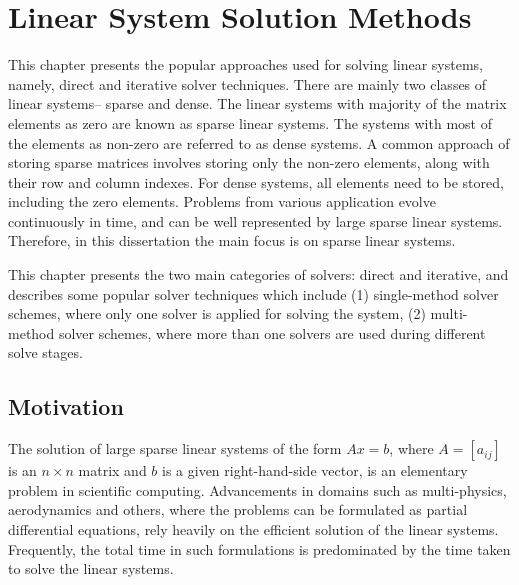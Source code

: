 \chapter{Linear System Solution Methods} \label{LS} 

This chapter presents the popular approaches used for solving linear systems, namely, 
direct and iterative solver techniques.  There are mainly two classes of linear systems-- sparse and dense. The linear systems with majority of the matrix elements as zero are known as sparse linear systems. The systems with most of the elements as non-zero are referred to as dense systems. A common approach of storing sparse matrices involves storing only the non-zero elements, along with their row and column indexes. For dense systems, all elements need to be
stored, including the zero elements. Problems from various application evolve continuously in time, and can be well represented by large sparse linear systems. Therefore, in this dissertation the main focus is on sparse linear systems.

This chapter presents the two main categories of solvers: direct and iterative, and describes some popular solver techniques which include (1) single-method solver schemes, where only one solver is applied for solving the system, (2) multi-method solver schemes, where more than one solvers are used during different solve stages. 

\section{Motivation}
The solution of large sparse linear systems of the form $Ax = b$, where $A = [a_{ij} ]$ is an $n \times n$ matrix and $b$ is a given right-hand-side vector, is an elementary problem in scientific computing. Advancements in domains such as multi-physics, aerodynamics and others, where the problems can be formulated as partial differential equations, rely heavily on the efficient solution of the linear systems. Frequently, the total time in such formulations is predominated by the time taken to solve the linear systems.

